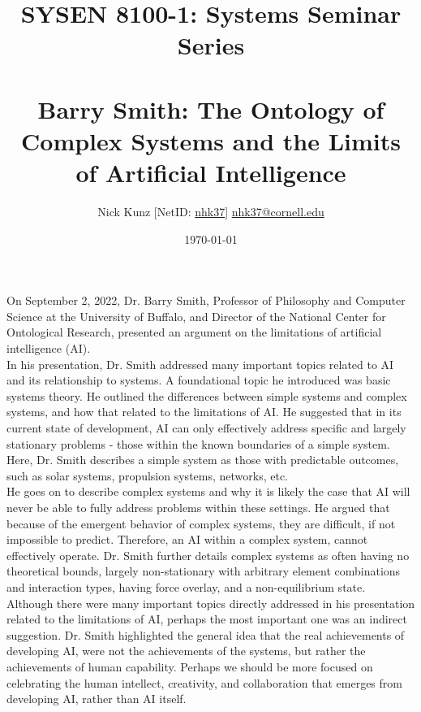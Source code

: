 \documentclass[11pt]{article}
\begin{document}
\title{SYSEN 8100-1: Systems Seminar Series\\~\\
    \Large Barry Smith: The Ontology of Complex Systems and the Limits of Artificial Intelligence
}
\author{
    Nick Kunz [NetID: \url{nhk37}] \hyperlink{nhk37@cornell.edu}{nhk37@cornell.edu}
}
\date{\today}
\maketitle

\noindent On September 2, 2022, Dr. Barry Smith, Professor of Philosophy and Computer Science at the University of Buffalo, and Director of the National Center for Ontological Research, presented an argument on the limitations of artificial intelligence (AI).\\

\noindent In his presentation, Dr. Smith addressed many important topics related to AI and its relationship to systems. A foundational topic he introduced was basic systems theory. He outlined the differences between simple systems and complex systems, and how that related to the limitations of AI. He suggested that in its current state of development, AI can only effectively address specific and largely stationary problems - those within the known boundaries of a simple system. Here, Dr. Smith describes a simple system as those with predictable outcomes, such as solar systems, propulsion systems, networks, etc.\\

\noindent He goes on to describe complex systems and why it is likely the case that AI will never be able to fully address problems within these settings. He argued that because of the emergent behavior of complex systems, they are difficult, if not impossible to predict. Therefore, an AI within a complex system, cannot effectively operate. Dr. Smith further details complex systems as often having no theoretical bounds, largely non-stationary with arbitrary element combinations and interaction types, having force overlay, and a non-equilibrium state. \\

\noindent Although there were many important topics directly addressed in his presentation related to the limitations of AI, perhaps the most important one was an indirect suggestion. Dr. Smith highlighted the general idea that the real achievements of developing AI, were not the achievements of the systems, but rather the achievements of human capability. Perhaps we should be more focused on celebrating the human intellect, creativity, and collaboration that emerges from developing AI, rather than AI itself.
\end{document}
